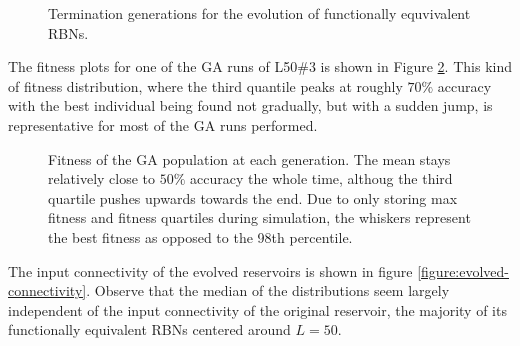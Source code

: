 \begin{figure}
  \centering
  \caption{
    Termination generations for the evolution of functionally equvivalent RBNs.
  }
  \label{figure:termination-generations}
\end{figure}

The fitness plots for one of the GA runs of L50\#3 is shown in Figure \ref{figure:fitness-generations}.
This kind of fitness distribution,
where the third quantile peaks at roughly $70\%$ accuracy with the best individual being found not gradually, but with a sudden jump, is representative for most of the GA runs performed.

\begin{figure}
  \centering
  
  \caption{
    Fitness of the GA population at each generation.
    The mean stays relatively close to $50\%$ accuracy the whole time,
    althoug the third quartile pushes upwards towards the end.
    Due to only storing max fitness and fitness quartiles during simulation,
    the whiskers represent the best fitness as opposed to the 98th percentile.
    }
  \label{figure:fitness-generations}
\end{figure}

The input connectivity of the evolved reservoirs is shown in figure \ref{figure:evolved-connectivity}.
Observe that the median of the distributions seem largely independent of the input connectivity of the original reservoir,
the majority of its functionally equivalent RBNs centered around $L=50$.

